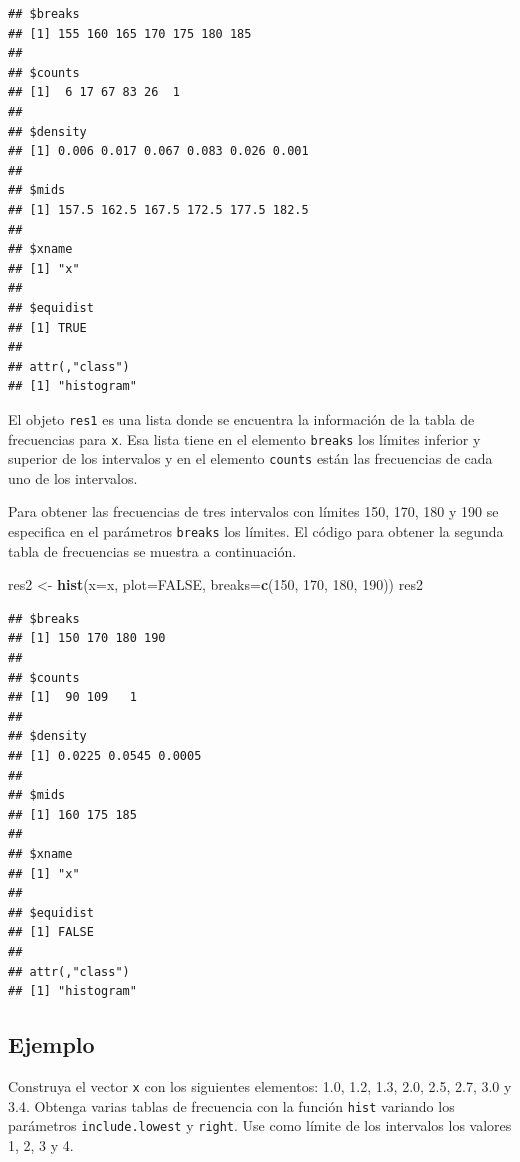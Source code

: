 \documentclass[10pt,]{krantz}
\makeatletter
\newenvironment{Shaded}{\begin{snugshade}}{\end{snugshade}}
\newcommand{\KeywordTok}[1]{\textcolor[rgb]{0.13,0.29,0.53}{\textbf{{#1}}}}
\newcommand{\DataTypeTok}[1]{\textcolor[rgb]{0.13,0.29,0.53}{{#1}}}
\newcommand{\DecValTok}[1]{\textcolor[rgb]{0.00,0.00,0.81}{{#1}}}
\newcommand{\StringTok}[1]{\textcolor[rgb]{0.31,0.60,0.02}{{#1}}}
\newcommand{\OtherTok}[1]{\textcolor[rgb]{0.56,0.35,0.01}{{#1}}}
\newcommand{\NormalTok}[1]{{#1}}
\newenvironment{kframe}{%
\medskip{}
\setlength{\fboxsep}{.8em}
 \def\at@end@of@kframe{}%
 \ifinner\ifhmode%
  \def\at@end@of@kframe{\end{minipage}}%
  \begin{minipage}{\columnwidth}%
 \fi\fi%
 \def\FrameCommand##1{\hskip\@totalleftmargin \hskip-\fboxsep
 \colorbox{shadecolor}{##1}\hskip-\fboxsep
     \hskip-\linewidth \hskip-\@totalleftmargin \hskip\columnwidth}%
 \MakeFramed {\advance\hsize-\width
   \@totalleftmargin\z@ \linewidth\hsize
   \@setminipage}}%
 {\par\unskip\endMakeFramed%
 \at@end@of@kframe}
\renewenvironment{Shaded}{\begin{kframe}}{\end{kframe}}
\makeatother
\begin{document}
\begin{verbatim}
## $breaks
## [1] 155 160 165 170 175 180 185
## 
## $counts
## [1]  6 17 67 83 26  1
## 
## $density
## [1] 0.006 0.017 0.067 0.083 0.026 0.001
## 
## $mids
## [1] 157.5 162.5 167.5 172.5 177.5 182.5
## 
## $xname
## [1] "x"
## 
## $equidist
## [1] TRUE
## 
## attr(,"class")
## [1] "histogram"
\end{verbatim}

El objeto \texttt{res1} es una lista donde se encuentra la información
de la tabla de frecuencias para \texttt{x}. Esa lista tiene en el
elemento \texttt{breaks} los límites inferior y superior de los
intervalos y en el elemento \texttt{counts} están las frecuencias de
cada uno de los intervalos.

Para obtener las frecuencias de tres intervalos con límites 150, 170,
180 y 190 se especifica en el parámetros \texttt{breaks} los límites. El
código para obtener la segunda tabla de frecuencias se muestra a
continuación.

\begin{Shaded}
\begin{Highlighting}[]
\NormalTok{res2 <-}\StringTok{ }\KeywordTok{hist}\NormalTok{(}\DataTypeTok{x=}\NormalTok{x, }\DataTypeTok{plot=}\OtherTok{FALSE}\NormalTok{, }
             \DataTypeTok{breaks=}\KeywordTok{c}\NormalTok{(}\DecValTok{150}\NormalTok{, }\DecValTok{170}\NormalTok{, }\DecValTok{180}\NormalTok{, }\DecValTok{190}\NormalTok{))}
\NormalTok{res2}
\end{Highlighting}
\end{Shaded}

\begin{verbatim}
## $breaks
## [1] 150 170 180 190
## 
## $counts
## [1]  90 109   1
## 
## $density
## [1] 0.0225 0.0545 0.0005
## 
## $mids
## [1] 160 175 185
## 
## $xname
## [1] "x"
## 
## $equidist
## [1] FALSE
## 
## attr(,"class")
## [1] "histogram"
\end{verbatim}

\subsection*{Ejemplo}\label{ejemplo-16}


Construya el vector \texttt{x} con los siguientes elementos: 1.0, 1.2,
1.3, 2.0, 2.5, 2.7, 3.0 y 3.4. Obtenga varias tablas de frecuencia con
la función \texttt{hist} variando los parámetros \texttt{include.lowest}
y \texttt{right}. Use como límite de los intervalos los valores 1, 2, 3
y 4.
\end{document}
